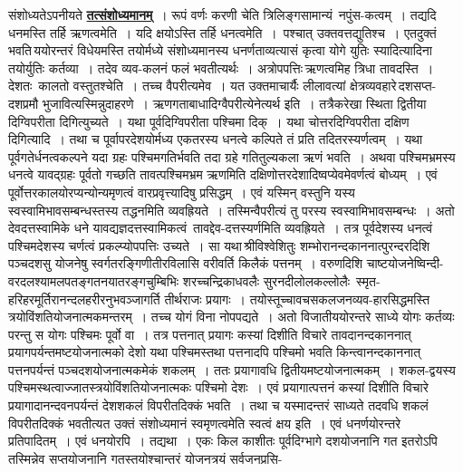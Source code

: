 \documentclass[11pt, openany]{book}
\begin{document}
\begin{sloppypar}
संशोध्यतेऽपनीयते \hyperref[1.7]{\textbf{तत्संशोध्यमानम्}}~। रूपं वर्णः करणी चेति त्रिलिङ्गसामान्यं~नपुंस-कत्वम्~। तद्यदि धनमस्ति तर्हि ऋणत्वमेति~। यदि क्षयोऽस्ति तर्हि धनत्वमेति~।~पश्चात् उक्तवत्तद्युतिश्च~। एतदुक्तं भवति\textendash \,ययोरन्तरं विधेयमस्ति तयोर्मध्ये संशोध्यमानस्य धनर्णताव्यत्यासं कृत्वा योगे युतिः स्यादित्यादिना तयोर्युतिः कर्तव्या~। तदेव व्यव-कलनं फलं भवतीत्यर्थः~। अत्रोपपत्तिः\textendash \,ऋणत्वमिह त्रिधा तावदस्ति~। देशतः~कालतो वस्तुतश्चेति~। तच्च वैपरीत्यमेव~। यत उक्तमाचार्यैः {\color{violet}लीलावत्यां क्षेत्रव्यवहारे\textendash \,दशसप्त-दशप्रमौ भुजावि}त्यस्मिन्नुदाहरणे~। ऋणगताबाधादिग्वैपरीत्येनेत्यर्थ इति~। तत्रैकरेखा स्थिता द्वितीया दिग्विपरीता दिगित्युच्यते~। यथा पूर्वदिग्विपरीता पश्चिमा दिक्~। यथा चोत्तरदिग्विपरीता दक्षिण दिगित्यादि~। तथा च पूर्वापरदेशयोर्मध्य एकतरस्य धनत्वे कल्पिते तं प्रति तदितरस्यर्णत्वम्~। यथा पूर्वगतेर्धनत्वकल्पने यदा ग्रहः पश्चिमगतिर्भवति तदा ग्रहे गतितुल्यकला ऋणं भवति~। अथवा पश्चिमभ्रमस्य धनत्वे यावद्ग्रहः पूर्वतो गच्छति तावत्पश्चिमभ्रम ऋणमिति दक्षिणोत्तरदेशादिष्वप्येवमेवर्णत्वं बोध्यम्~। एवं पूर्वोत्तरकालयोरप्यन्योन्यमृणत्वं वारप्रवृत्त्यादिषु प्रसिद्धम्~। एवं यस्मिन् वस्तुनि यस्य स्वस्वामिभावसम्बन्धस्तस्य तद्धनमिति व्यवह्रियते~। तस्मिन्वैपरीत्यं तु परस्य स्वस्वामिभावसम्बन्धः~। अतो देवदत्तस्वामिके धने यावद्यज्ञदत्तस्वामिकत्वं~तावद्देव-दत्तस्यर्णमिति व्यवह्रियते~। तत्र पूर्वदेशस्य धनत्वं पश्चिमदेशस्य चर्णत्वं प्रकल्प्योपपत्तिः उच्यते~। सा यथा\textendash \,श्रीविश्वेशितुः शम्भोरानन्दकाननात्पुरन्दरदिशि पञ्चदशसु योजनेषु स्वर्गतरङ्गिणीतीरविलासि वरीवर्ति किलैकं पत्तनम्~। वरुणदिशि चाष्टयोजनेष्विन्दी-वरदलश्यामलपतङ्गतनयातरङ्गचुम्बिभिः शरच्चन्द्रिकाधवलैः सुरनदीलोलकल्लोलैः~स्मृत-हरिहरमूर्तिरानन्दलहरीरनुभवञ्जागर्ति तीर्थराजः प्रयागः~। तयोस्तूच्चावचसकलजनव्यव-हारसिद्धमस्ति त्रयोविंशतियोजनात्मकमन्तरम्~। तच्च योगं विना नोपपद्यते~। अतो विजातीययोरन्तरे साध्ये योगः कर्तव्यः परन्तु स योगः पश्चिमः पूर्वो वा~। तत्र पत्तनात् प्रयागः कस्यां दिशीति विचारे तावदानन्दकाननात् प्रयागपर्यन्तमष्टयोजनात्मको देशो यथा पश्चिमस्तथा पत्तनादपि पश्चिमो भवति किन्त्वानन्दकाननात् पत्तनपर्यन्तं पञ्चदशयोजनात्मकमेकं शकलम्~। ततः प्रयागावधि द्वितीयमष्टयोजनात्मकम्~। शकल-द्वयस्य पश्चिमस्थत्वाज्जातस्त्रयोविंशतियोजनात्मकः पश्चिमो देशः~। एवं प्रयागात्पत्तनं कस्यां दिशीति विचारे प्रयागादानन्दवनपर्यन्तं देशशकलं विपरीतदिक्कं भवति~। तथा च यस्मादन्तरं साध्यते तदवधि शकलं विपरीतदिक्कं भवतीत्यत उक्तं संशोध्यमानं स्वमृणत्वमेति स्वत्वं क्षय इति~। एवं धनर्णयोरन्तरे प्रतिपादितम्~। एवं धनयोरपि~। तद्यथा~। एकः किल काशीतः पूर्वदिग्भागे दशयोजनानि गत इतरोऽपि तस्मिन्नेव सप्तयोजनानि गतस्तयोश्चान्तरं योजनत्रयं सर्वजनप्रसि-
\end{sloppypar}
\end{document}
